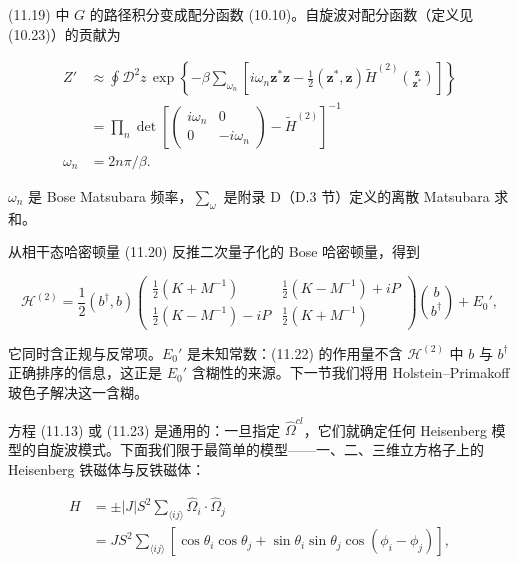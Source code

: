 (11.19) 中 $G$ 的路径积分变成配分函数 (10.10)。自旋波对配分函数（定义见 (10.23)）的贡献为

\begin{align*}
Z ' & \approx \oint \mathcal {D} ^ {2} z \, \exp \left\{ - \beta \sum_ {\omega_ {n}} \left[ i \omega_ {n} \mathbf {z} ^ {*} \mathbf {z} - \frac {1}{2} ( \mathbf {z} ^ {*}, \mathbf {z} ) \tilde {H} ^ {(2)} \binom {\mathbf {z}} {\mathbf {z} ^ {*}} \right] \right\}\\
& = \prod_ {n} \det \left[ \left( \begin{array}{cc} i \omega_ {n} & 0 \\ 0 & - i \omega_ {n} \end{array} \right) - \tilde {H} ^ {(2)} \right] ^ {- 1}\\
\omega_ {n} & = 2 n \pi / \beta .
\tag{11.22}
\end{align*}

$\omega_{n}$ 是 Bose Matsubara 频率，$\sum_{\omega}$ 是附录 D（D.3 节）定义的离散 Matsubara 求和。

从相干态哈密顿量 (11.20) 反推二次量子化的 Bose 哈密顿量，得到

\begin{equation*}
\mathcal {H} ^ {(2)} = \frac {1}{2} \left( b ^ {\dagger}, b \right) \left( \begin{array}{cc} \frac {1}{2} ( K + M ^ {- 1} ) & \frac {1}{2} ( K - M ^ {- 1} ) + iP \\ \frac {1}{2} ( K - M ^ {- 1} ) - iP & \frac {1}{2} ( K + M ^ {- 1} ) \end{array} \right) \binom{b}{b ^ {\dagger}} + E _ {0} ' ,
\tag{11.23}
\end{equation*}

它同时含正规与反常项。$E_{0}'$ 是未知常数：(11.22) 的作用量不含 $\mathcal{H}^{(2)}$ 中 $b$ 与 $b^{\dagger}$ 正确排序的信息，这正是 $E_{0}'$ 含糊性的来源。下一节我们将用 Holstein--Primakoff 玻色子解决这一含糊。

方程 (11.13) 或 (11.23) 是通用的：一旦指定 $\hat{\Omega}^{cl}$，它们就确定任何 Heisenberg 模型的自旋波模式。下面我们限于最简单的模型——一、二、三维立方格子上的 Heisenberg 铁磁体与反铁磁体：

\begin{align*}
H & = \pm | J | S ^ {2} \sum_{\langle ij \rangle} \hat {\Omega} _ {i} \cdot \hat {\Omega} _ {j}\\
& = J S ^ {2} \sum_{\langle ij \rangle} \left[ \cos \theta_ {i} \cos \theta_ {j} + \sin \theta_ {i} \sin \theta_ {j} \cos ( \phi_ {i} - \phi_ {j} ) \right] ,
\tag{11.24}
\end{align*}

